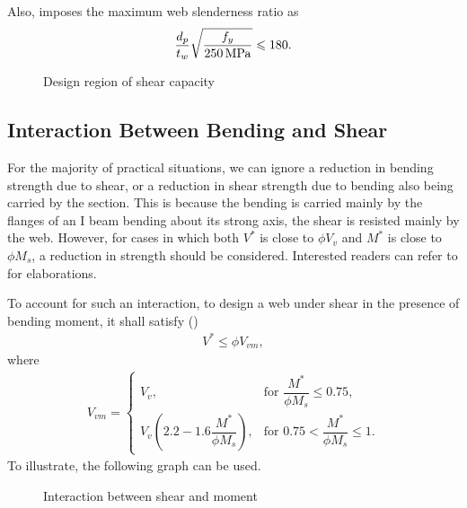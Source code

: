 Also,  imposes the maximum web slenderness ratio as
\begin{gather}
\dfrac{d_p}{t_w}\sqrt{\dfrac{f_y}{\SI{250}{\mega\pascal}}}\leqslant180.
\end{gather}
\begin{figure}[H]
\centering\caption{Design region of shear capacity}
\end{figure}
\subsection{Interaction Between Bending and Shear}
For the majority of practical situations, we can ignore a reduction in bending strength due to shear, or a reduction in shear strength due to bending also being carried by the section. This is because the bending is carried mainly by the flanges of an I beam bending about its strong axis, the shear is resisted mainly by the web.
However, for cases in which both $V^*$ is close to $\phi{}V_v$ and $M^*$ is close to $\phi{}M_s$, a reduction in strength should be considered. Interested readers can refer to \citet{JCWRCA1971} for elaborations.

To account for such an interaction, to design a web under shear in the presence of bending moment, it shall satisfy ()
\begin{gather}
V^*\leqslant\phi{}V_{vm},
\end{gather}
where
\begin{gather}
V_{vm}=\left\{
\begin{array}{ll}
V_v,&\text{for~}\dfrac{M^*}{\phi{}M_s}\leqslant0.75,\\
V_v\left(2.2-1.6\dfrac{M^*}{\phi{}M_s}\right),&\text{for~}0.75<\dfrac{M^*}{\phi{}M_s}\leqslant1.
\end{array}
\right.
\end{gather}
To illustrate, the following graph can be used.
\begin{figure}[H]
\centering\caption{Interaction between shear and moment}
\end{figure}

